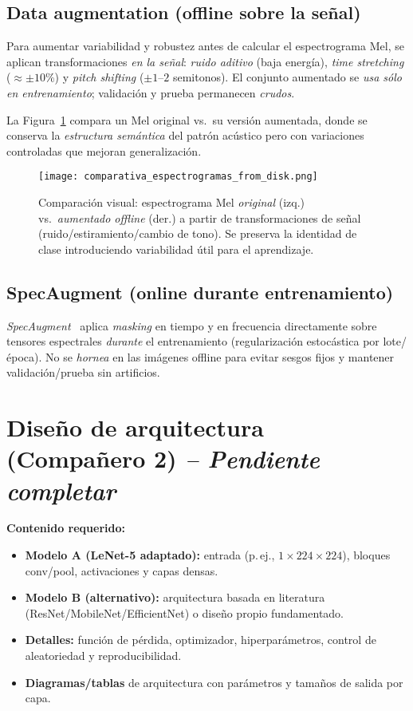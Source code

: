 \documentclass[conference]{IEEEtran}
\begin{document}
\subsection{Data augmentation (offline sobre la señal)}
Para aumentar variabilidad y robustez antes de calcular el espectrograma Mel, se aplican transformaciones \emph{en la señal}: \emph{ruido aditivo} (baja energía), \emph{time stretching} ($\approx\pm10\%$) y \emph{pitch shifting} ($\pm1$--$2$ semitonos). El conjunto aumentado se \emph{usa sólo en entrenamiento}; validación y prueba permanecen \emph{crudos}. 

La Figura~\ref{fig:comparativa} compara un Mel original vs.\ su versión aumentada, donde se conserva la \emph{estructura semántica} del patrón acústico pero con variaciones controladas que mejoran generalización.

\begin{figure}[H]
    \centering
    \texttt{[image: comparativa\_espectrogramas\_from\_disk.png]}
    \caption{Comparación visual: espectrograma Mel \emph{original} (izq.) vs.\ \emph{aumentado offline} (der.) a partir de transformaciones de señal (ruido/estiramiento/cambio de tono). Se preserva la identidad de clase introduciendo variabilidad útil para el aprendizaje.}
    \label{fig:comparativa}
\end{figure}

\subsection{SpecAugment (online durante entrenamiento)}
\emph{SpecAugment}~\cite{park2019specaugment} aplica \emph{masking} en tiempo y en frecuencia directamente sobre tensores espectrales \emph{durante} el entrenamiento (regularización estocástica por lote/época). No se \emph{hornea} en las imágenes offline para evitar sesgos fijos y mantener validación/prueba sin artificios.

\section{Diseño de arquitectura (Compañero 2) \textit{-- Pendiente completar}}
\noindent\textbf{Contenido requerido:}
\begin{itemize}
    \item \textbf{Modelo A (LeNet-5 adaptado):} entrada (p.\,ej., $1\times224\times224$), bloques conv/pool, activaciones y capas densas.
    \item \textbf{Modelo B (alternativo):} arquitectura basada en literatura (ResNet/MobileNet/EfficientNet) o diseño propio fundamentado.
    \item \textbf{Detalles:} función de pérdida, optimizador, hiperparámetros, control de aleatoriedad y reproducibilidad.
    \item \textbf{Diagramas/tablas} de arquitectura con parámetros y tamaños de salida por capa.
\end{itemize}
\end{document}
